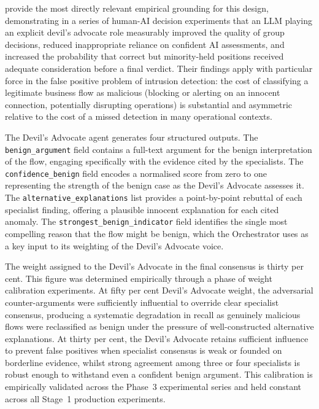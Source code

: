 \textcite{Yin2024} provide the most directly relevant empirical grounding for this design, demonstrating in a series of human-AI decision experiments that an LLM playing an explicit devil's advocate role measurably improved the quality of group decisions, reduced inappropriate reliance on confident AI assessments, and increased the probability that correct but minority-held positions received adequate consideration before a final verdict. Their findings apply with particular force in the false positive problem of intrusion detection: the cost of classifying a legitimate business flow as malicious (blocking or alerting on an innocent connection, potentially disrupting operations) is substantial and asymmetric relative to the cost of a missed detection in many operational contexts.

The Devil's Advocate agent generates four structured outputs. The \texttt{benign\_argument} field contains a full-text argument for the benign interpretation of the flow, engaging specifically with the evidence cited by the specialists. The \texttt{confidence\_benign} field encodes a normalised score from zero to one representing the strength of the benign case as the Devil's Advocate assesses it. The \texttt{alternative\_explanations} list provides a point-by-point rebuttal of each specialist finding, offering a plausible innocent explanation for each cited anomaly. The \texttt{strongest\_benign\_indicator} field identifies the single most compelling reason that the flow might be benign, which the Orchestrator uses as a key input to its weighting of the Devil's Advocate voice.

The weight assigned to the Devil's Advocate in the final consensus is thirty per cent. This figure was determined empirically through a phase of weight calibration experiments. At fifty per cent Devil's Advocate weight, the adversarial counter-arguments were sufficiently influential to override clear specialist consensus, producing a systematic degradation in recall as genuinely malicious flows were reclassified as benign under the pressure of well-constructed alternative explanations. At thirty per cent, the Devil's Advocate retains sufficient influence to prevent false positives when specialist consensus is weak or founded on borderline evidence, whilst strong agreement among three or four specialists is robust enough to withstand even a confident benign argument. This calibration is empirically validated across the Phase~3 experimental series and held constant across all Stage~1 production experiments.

